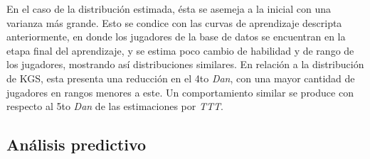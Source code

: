 \documentclass[11pt,twoside, spanish]{report} %
\begin{document}
En el caso de la distribuci\'on estimada, \'esta se asemeja a la inicial con una varianza m\'as grande.
Esto se condice con las curvas de aprendizaje descripta anteriormente, en donde los jugadores de la base de datos se encuentran en la etapa final del aprendizaje, y se estima poco cambio de habilidad y de rango de los jugadores, mostrando as\'i distribuciones similares.
En relaci\'on a la distribuci\'on de KGS, esta presenta una reducci\'on en el 4to \textit{Dan}, con una mayor cantidad de jugadores en rangos menores a este.
Un comportamiento similar se produce con respecto al 5to \textit{Dan} de las estimaciones por \textit{TTT}.



\vspace{5cm}
\subsection{An\'alisis predictivo}
\end{document}
